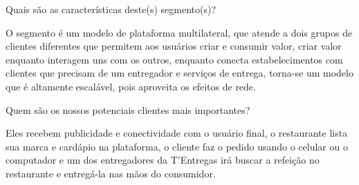 \begin{commentA} \vspace{0.3cm} \noindent Quais são as características deste(s) segmento(s)? \par \vspace{0.1cm} \end{commentA}


O segmento é um modelo de plataforma multilateral, que atende a dois grupos de clientes diferentes que permitem aos usuários criar e consumir valor, criar valor enquanto interagem uns com os outros, enquanto conecta estabelecimentos com clientes que precisam de um entregador e serviços de entrega, torna-se um modelo que é altamente escalável, pois aproveita os efeitos de rede.\par


\begin{commentA} \vspace{0.3cm} \noindent Quem são os nossos potenciais clientes mais importantes? \par \vspace{0.1cm} \end{commentA}


Eles recebem publicidade e conectividade com o usuário final, o restaurante lista sua marca e cardápio na plataforma, o cliente faz o pedido usando o celular ou o computador e um dos entregadores da T'Entregas irá buscar a refeição no restaurante e entregá-la nas mãos do consumidor.\par

